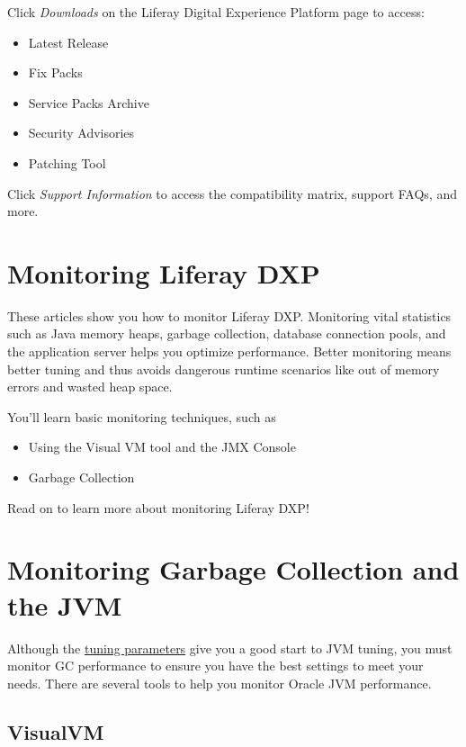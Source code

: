 Click \emph{Downloads} on the Liferay Digital Experience Platform page
to access:

\begin{itemize}
\tightlist
\item
  Latest Release
\item
  Fix Packs
\item
  Service Packs Archive
\item
  Security Advisories
\item
  Patching Tool
\end{itemize}

Click \emph{Support Information} to access the compatibility matrix,
support FAQs, and more.

\chapter{Monitoring Liferay DXP}\label{monitoring-liferay-dxp}

These articles show you how to monitor Liferay DXP. Monitoring vital
statistics such as Java memory heaps, garbage collection, database
connection pools, and the application server helps you optimize
performance. Better monitoring means better tuning and thus avoids
dangerous runtime scenarios like out of memory errors and wasted heap
space.

You'll learn basic monitoring techniques, such as

\begin{itemize}
\tightlist
\item
  Using the Visual VM tool and the JMX Console
\item
  Garbage Collection
\end{itemize}

Read on to learn more about monitoring Liferay DXP!

\chapter{Monitoring Garbage Collection and the
JVM}\label{monitoring-garbage-collection-and-the-jvm}

Although the
\href{/docs/7-2/deploy/-/knowledge_base/d/tuning-guidelines}{tuning
parameters} give you a good start to JVM tuning, you must monitor GC
performance to ensure you have the best settings to meet your needs.
There are several tools to help you monitor Oracle JVM performance.

\section{VisualVM}\label{visualvm}

